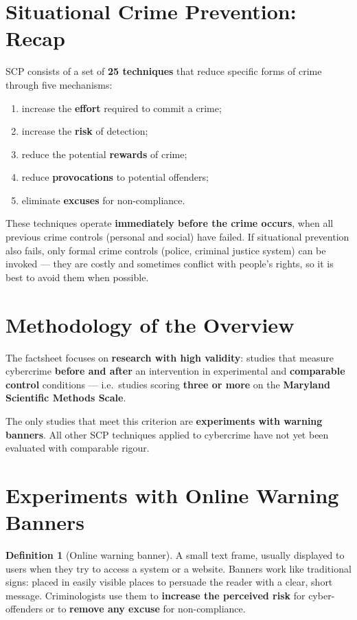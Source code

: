 \documentclass[11pt,a4paper,openany]{report}
\theoremstyle{definition}
\newtheorem{definition}{Definition}[chapter]
\theoremstyle{plain}
\theoremstyle{remark}
\begin{document}
\section{Situational Crime Prevention: Recap}

SCP consists of a set of \textbf{25 techniques} that reduce specific forms of crime through five mechanisms:
\begin{enumerate}
    \item increase the \textbf{effort} required to commit a crime;
    \item increase the \textbf{risk} of detection;
    \item reduce the potential \textbf{rewards} of crime;
    \item reduce \textbf{provocations} to potential offenders;
    \item eliminate \textbf{excuses} for non-compliance.
\end{enumerate}

These techniques operate \textbf{immediately before the crime occurs}, when all previous crime controls (personal and social) have failed. If situational prevention also fails, only formal crime controls (police, criminal justice system) can be invoked --- they are costly and sometimes conflict with people's rights, so it is best to avoid them when possible.

\section{Methodology of the Overview}

The factsheet focuses on \textbf{research with high validity}: studies that measure cybercrime \textbf{before and after} an intervention in experimental and \textbf{comparable control} conditions --- i.e.\ studies scoring \textbf{three or more} on the \textbf{Maryland Scientific Methods Scale}.

\begin{keypoint}
The only studies that meet this criterion are \textbf{experiments with warning banners}. All other SCP techniques applied to cybercrime have not yet been evaluated with comparable rigour.
\end{keypoint}

\section{Experiments with Online Warning Banners}

\begin{definition}[Online warning banner]
A small text frame, usually displayed to users when they try to access a system or a website. Banners work like traditional signs: placed in easily visible places to persuade the reader with a clear, short message. Criminologists use them to \textbf{increase the perceived risk} for cyber-offenders or to \textbf{remove any excuse} for non-compliance.
\end{definition}
\end{document}
